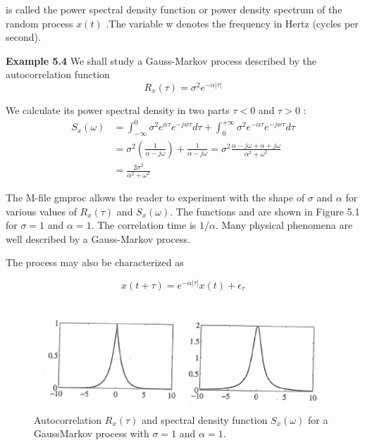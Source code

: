 	      	 
	      	 is called the power spectral density function or power density spectrum of the random process $x(t)$ .The variable w denotes the frequency in Hertz (cycles per second). 
	      	 
	      	 \textbf{Example 5.4} We shall study a Gauss-Markov process described by the autocorrelation function 
	      	 \begin{equation}\label{5.18}
	      	  R_{x}(\tau)=\sigma^{2}e^{-\alpha|\tau|}
	      	 \end{equation}
	      	  
	      	 
	      	 We calculate its power spectral density in two parts  $\tau<0$ and $\tau>0$ :
	      	 \begin{equation}\label{5.19}
	      	 \begin{aligned}
	      	 S_{x}(\omega)&=\int_{-\infty}^{0}\sigma^{2}e^{\alpha\tau}e^{-jw\tau}d\tau+\int_{0}^{+\infty}\sigma^{2}e^{-\alpha\tau}e^{-jw\tau}d\tau\\
	      	 &=\sigma^{2}(\frac{1}{\alpha-j\omega})+\frac{1}{\alpha-j\omega}=\sigma^{2}\frac{\alpha-j\omega+\alpha+j\omega}{\alpha^{2}+\omega^{2}}\\
	      	 &=\frac{2\sigma^{2}}{\alpha^{2}+\omega^{2}}
	      	\end{aligned}
	      	\end{equation}
	      	 
	      	 
	      	 
	      	 The M-file gmproc allows the reader to experiment with the shape of  $\sigma$ and  $\alpha $  for various values of $ R_{x}(\tau) $ and $ S_{x}(\omega) $. The functions  and  are shown in Figure 5.1 for $ \sigma=1 $ and $ \alpha=1 $. The correlation time is $ 1/\alpha $. Many physical phenomena are well described by a Gauss-Markov process.
	      	 
	      	 The process may also be characterized as 
	      	 
	      	 \[ x(t+\tau)=e^{-\alpha|\tau|}x(t)+\epsilon_{\tau} \]       
	      	 
       \begin{figure}[h]
      	\centering
      	\includegraphics[width=0.7\linewidth]{TeX_files/Part02/chapter05/image/1}
      	\caption{Autocorrelation $ R_{x}(\tau) $ and spectral density function $ S_{x}(\omega) $ for a GaussMarkov process with $ \sigma=1 $ and $ \alpha=1 $.}
      \end{figure}
      
